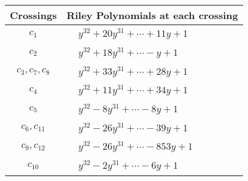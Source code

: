 \documentclass[1p]{elsarticle_modified}
\theoremstyle{definition}
\begin{document}
\begin{tabular}{m{50pt}|m{274pt}}
Crossings & \hspace{64pt}Riley Polynomials at each crossing \\
\hline $$\begin{aligned}c_{1}\end{aligned}$$&$\begin{aligned}
&y^{32}+20 y^{31}+\cdots+11 y+1
\end{aligned}$\\
\hline $$\begin{aligned}c_{2}\end{aligned}$$&$\begin{aligned}
&y^{32}+18 y^{31}+\cdots- y+1
\end{aligned}$\\
\hline $$\begin{aligned}c_{3},c_{7},c_{8}\end{aligned}$$&$\begin{aligned}
&y^{32}+33 y^{31}+\cdots+28 y+1
\end{aligned}$\\
\hline $$\begin{aligned}c_{4}\end{aligned}$$&$\begin{aligned}
&y^{32}+11 y^{31}+\cdots+34 y+1
\end{aligned}$\\
\hline $$\begin{aligned}c_{5}\end{aligned}$$&$\begin{aligned}
&y^{32}-8 y^{31}+\cdots-8 y+1
\end{aligned}$\\
\hline $$\begin{aligned}c_{6},c_{11}\end{aligned}$$&$\begin{aligned}
&y^{32}-26 y^{31}+\cdots-39 y+1
\end{aligned}$\\
\hline $$\begin{aligned}c_{9},c_{12}\end{aligned}$$&$\begin{aligned}
&y^{32}-26 y^{31}+\cdots-853 y+1
\end{aligned}$\\
\hline $$\begin{aligned}c_{10}\end{aligned}$$&$\begin{aligned}
&y^{32}-2 y^{31}+\cdots-6 y+1
\end{aligned}$\\
\hline
\end{tabular}\\~\\
\end{document}
